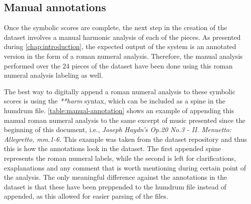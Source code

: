 \subsection{Manual annotations}
Once the symbolic scores are complete, the next step in the creation of the dataset involves a manual harmonic analysis of each of the pieces. As presented during \autoref{chap:introduction}, the expected output of the system is an annotated version in the form of a roman numeral analysis. Therefore, the manual analysis performed over the 24 pieces of the dataset have been done using this roman numeral analysis labeling as well.

The best way to digitally append a roman numeral analysis to these symbolic scores is using the \emph{**harm} \cite{harm} syntax, which can be included as a spine in the humdrum file. \autoref{table:manual-annotation} shows an example of appending this manual roman numeral analysis to the same excerpt of music presented since the beginning of this document, i.e., \emph{Joseph Haydn's Op.20 No.3 - II. Menuetto: Allegretto, mm.1-6}. This example was taken from the dataset repository and thus this is how the annotations look in the dataset. The first appended spine represents the roman numeral labels, while the second is left for clarifications, exaplanations and any comment that is worth mentioning during certain point of the analysis. The only meaningful difference against the annotations in the dataset is that these have been preppended to the humdrum file instead of appended, as this allowed for easier parsing of the files.

